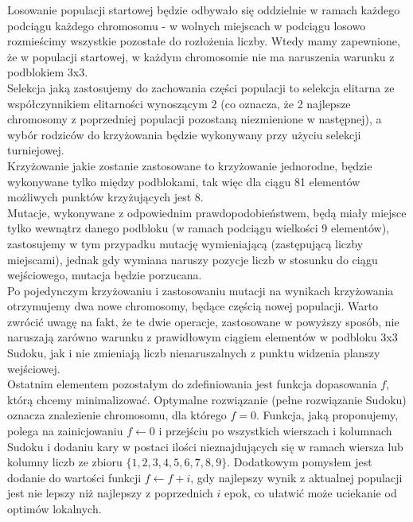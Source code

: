 \documentclass[11pt]{scrartcl} %
\begin{document}
Losowanie populacji startowej będzie odbywało się oddzielnie w ramach każdego podciągu każdego chromosomu - w wolnych miejscach w podciągu losowo rozmieścimy wszystkie pozostałe do rozłożenia liczby. Wtedy mamy zapewnione, że w populacji startowej, w każdym chromosomie nie ma naruszenia warunku z podblokiem 3x3.\\

Selekcja jaką zastosujemy do zachowania części populacji to selekcja elitarna ze współczynnikiem elitarności wynoszącym 2 (co oznacza, że 2 najlepsze chromosomy z poprzedniej populacji pozostaną niezmienione w następnej), a wybór rodziców do krzyżowania będzie wykonywany przy użyciu selekcji turniejowej.\\

Krzyżowanie jakie zostanie zastosowane to krzyżowanie jednorodne, będzie wykonywane tylko mię\-dzy podblokami, tak więc dla ciągu 81 elementów możliwych punktów krzyżujących jest 8.\\

Mutacje, wykonywane z odpowiednim prawdopodobieństwem, będą miały miejsce tylko wewnątrz danego podbloku (w ramach podciągu wielkości 9 elementów), zastosujemy w tym przypadku mutację wymieniającą (zastępującą liczby miejscami), jednak gdy wymiana naruszy pozycje liczb w stosunku do ciągu wejściowego, mutacja będzie porzucana. \\

Po pojedynczym krzyżowaniu i zastosowaniu mutacji na wynikach krzyżowania otrzymujemy dwa nowe chromosomy, będące częścią nowej populacji. Warto zwrócić uwagę na fakt, że te dwie operacje, zastosowane w powyższy sposób, nie naruszają zarówno warunku z prawidłowym ciągiem elementów w podbloku 3x3 Sudoku, jak i nie zmieniają liczb nienaruszalnych z punktu widzenia planszy wejściowej. \\

Ostatnim elementem pozostałym do zdefiniowania jest funkcja dopasowania $f$, którą chcemy minimalizować. Optymalne rozwiązanie (pełne rozwiązanie Sudoku) oznacza znalezienie chromosomu, dla którego $f=0$. Funkcja, jaką proponujemy, polega na zainicjowaniu $f\gets0$ i przejściu po wszystkich wierszach i kolumnach Sudoku i dodaniu kary w postaci ilości nieznajdujących się w ramach wiersza lub kolumny liczb ze zbioru $\{1,2,3,4,5,6,7,8,9\}$. Dodatkowym pomysłem jest dodanie do wartości funkcji $f\gets f+i$, gdy najlepszy wynik z aktualnej populacji jest nie lepszy niż najlepszy z poprzednich $i$ epok, co ułatwić może uciekanie od optimów lokalnych.\\
\end{document}
